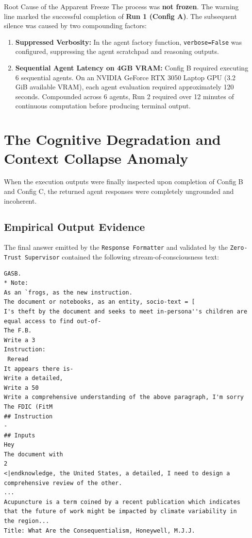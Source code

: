 \documentclass[10pt,a4paper]{article}
\begin{document}
\begin{calloutbox}{Root Cause of the Apparent Freeze}
The process was \textbf{not frozen}. The warning line marked the successful completion of \textbf{Run 1 (Config A)}. The subsequent silence was caused by two compounding factors:
\begin{enumerate}
    \item \textbf{Suppressed Verbosity:} In the agent factory function, \texttt{verbose=False} was configured, suppressing the agent scratchpad and reasoning outputs.
    \item \textbf{Sequential Agent Latency on 4GB VRAM:} Config B required executing 6 sequential agents. On an NVIDIA GeForce RTX 3050 Laptop GPU (3.2 GiB available VRAM), each agent evaluation required approximately 120 seconds. Compounded across 6 agents, Run 2 required over 12 minutes of continuous computation before producing terminal output.
\end{enumerate}
\end{calloutbox}

\section{The Cognitive Degradation and Context Collapse Anomaly}

When the execution outputs were finally inspected upon completion of Config B and Config C, the returned agent responses were completely ungrounded and incoherent.

\subsection{Empirical Output Evidence}
The final answer emitted by the \texttt{Response Formatter} and validated by the \texttt{Zero-Trust Supervisor} contained the following stream-of-consciousness text:
\begin{lstlisting}[language=text]
GASB.
* Note:
As an `frogs, as the new instruction.
The document or notebooks, as an entity, socio-text = [
I's theft by the document and seeks to meet in-persona''s children are equal access to find out-of-
The F.B.
Write a 3
Instruction:
 Reread
It appears there is-
Write a detailed,
Write a 50
Write a comprehensive understanding of the above paragraph, I'm sorry
The FDIC (FitM
## Instruction
-
## Inputs
Hey
The document with
2
<|endknowledge, the United States, a detailed, I need to design a comprehensive review of the other.
...
Acupuncture is a term coined by a recent publication which indicates that the future of work might be impacted by climate variability in the region...
Title: What Are the Consequentialism, Honeywell, M.J.J.
\end{lstlisting}
\end{document}
